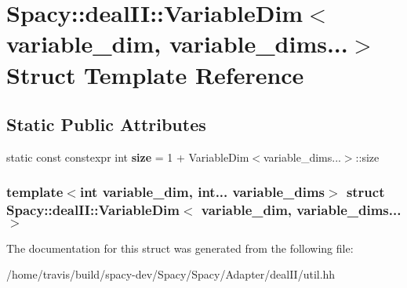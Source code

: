 \hypertarget{structSpacy_1_1dealII_1_1VariableDim_3_01variable__dim_00_01variable__dims_8_8_8_4}{\section{\-Spacy\-:\-:deal\-I\-I\-:\-:\-Variable\-Dim$<$ variable\-\_\-dim, variable\-\_\-dims...$>$ \-Struct \-Template \-Reference}
\label{structSpacy_1_1dealII_1_1VariableDim_3_01variable__dim_00_01variable__dims_8_8_8_4}
}
\subsection*{\-Static \-Public \-Attributes}
\begin{DoxyCompactItemize}
\item 
\hypertarget{structSpacy_1_1dealII_1_1VariableDim_3_01variable__dim_00_01variable__dims_8_8_8_4_aebc4163ada748495cef9301d701bb0d4}{static const constexpr int {\bfseries size} = 1 + \-Variable\-Dim$<$variable\-\_\-dims...$>$\-::size}\label{structSpacy_1_1dealII_1_1VariableDim_3_01variable__dim_00_01variable__dims_8_8_8_4_aebc4163ada748495cef9301d701bb0d4}

\end{DoxyCompactItemize}
\subsubsection*{template$<$int variable\-\_\-dim, int... variable\-\_\-dims$>$ struct Spacy\-::deal\-I\-I\-::\-Variable\-Dim$<$ variable\-\_\-dim, variable\-\_\-dims...$>$}



\-The documentation for this struct was generated from the following file\-:\begin{DoxyCompactItemize}
\item 
/home/travis/build/spacy-\/dev/\-Spacy/\-Spacy/\-Adapter/deal\-I\-I/util.\-hh\end{DoxyCompactItemize}

